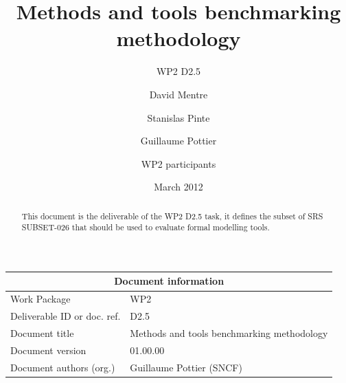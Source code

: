 \documentclass{template/openetcs_report}
\begin{document}
\frontmatter
{}




\title{Methods and tools benchmarking methodology}

\subtitle{WP2 D2.5}

\date{March 2012}


\author{David Mentre}


\author{Stanislas Pinte}


\author{Guillaume Pottier}


\author{WP2 participants}




\begin{abstract}
This document is the deliverable of the WP2 D2.5 task, it defines the subset of SRS SUBSET-026 that should be used
to evaluate formal modelling tools.
\end{abstract}

\maketitle

\begin{tabular}{|p{4.4cm}|p{8.7cm}|}
\hline
\multicolumn{2}{|c|}{Document information} \\
\hline
Work Package &  WP2  \\
Deliverable ID or doc. ref. & D2.5\\
\hline
Document title & Methods and tools benchmarking methodology \\
Document version & 01.00.00 \\
Document authors (org.)  & Guillaume Pottier (SNCF) \\
\hline
\end{tabular}
\end{document}
